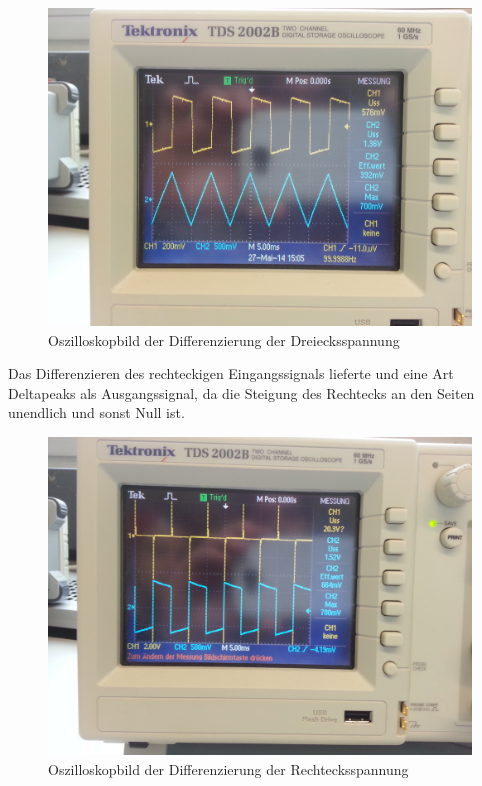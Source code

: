 \documentclass[a4paper,titlepage]{scrartcl}
\numberwithin{equation}{section}
\begin{document}
\begin{figure}[H]
\centering
\includegraphics[scale=.08]{bilder/aufgabe_3_4_1.jpg} 
\caption{Oszilloskopbild der Differenzierung der Dreiecksspannung}
\end{figure}

Das Differenzieren des rechteckigen Eingangssignals lieferte und eine Art Deltapeaks als Ausgangssignal, da die Steigung des Rechtecks an den Seiten unendlich und sonst Null ist.

\begin{figure}[H]
\centering
\includegraphics[scale=.08]{bilder/aufgabe_3_4_2.jpg} 
\caption{Oszilloskopbild der Differenzierung der Rechtecksspannung}
\end{figure}
\end{document}
